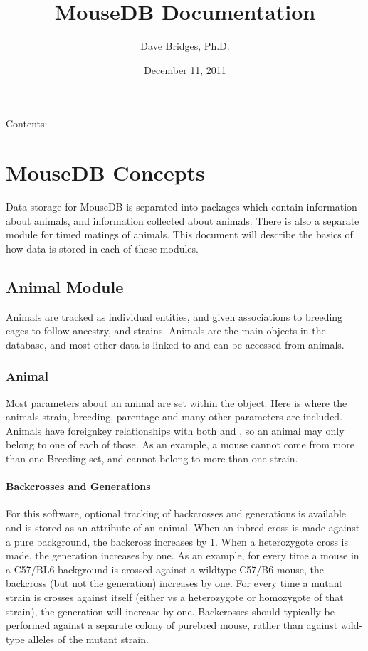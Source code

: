 \documentclass[letterpaper,10pt,english]{sphinxmanual}
\title{MouseDB Documentation}
\date{December 11, 2011}
\author{Dave Bridges, Ph.D.}
\begin{document}
\maketitle
\tableofcontents
{}\label{index::doc}


Contents:


\chapter{MouseDB Concepts}
\label{concepts:welcome-to-mousedb-s-documentation}\label{concepts::doc}\label{concepts:mousedb-concepts}
Data storage for MouseDB is separated into packages which contain information about animals, and information collected about animals.  There is also a separate module for timed matings of animals.  This document will describe the basics of how data is stored in each of these modules.


\section{Animal Module}
\label{concepts:animal-module}
Animals are tracked as individual entities, and given associations to breeding cages to follow ancestry, and strains.  Animals are the main objects in the database, and most other data is linked to and can be accessed from animals.


\subsection{Animal}
\label{concepts:animal}
Most parameters about an animal are set within the {\hyperref[api:mousedb.animal.models.Animal]{}} object. Here is where the animals strain, breeding, parentage and many other parameters are included.  Animals have foreignkey relationships with both {\hyperref[api:mousedb.animal.models.Strain]{}} and {\hyperref[api:mousedb.animal.models.Breeding]{}}, so an animal may only belong to one of each of those.  As an example, a mouse cannot come from more than one Breeding set, and cannot belong to more than one strain.


\subsubsection{Backcrosses and Generations}
\label{concepts:backcrosses-and-generations}
For this software, optional tracking of backcrosses and generations is available and is stored as an attribute of an animal.  When an inbred cross is made against a pure background, the backcross increases by 1.  When a heterozygote cross is made, the generation increases by one.  As an example, for every time a mouse in a C57/BL6 background is crossed against a wildtype C57/B6 mouse, the backcross (but not the generation) increases by one.  For every time a mutant strain is crosses against itself (either vs a heterozygote or homozygote of that strain), the generation will increase by one.  Backcrosses should typically be performed against a separate colony of purebred mouse, rather than against wild-type alleles of the mutant strain.
\end{document}

